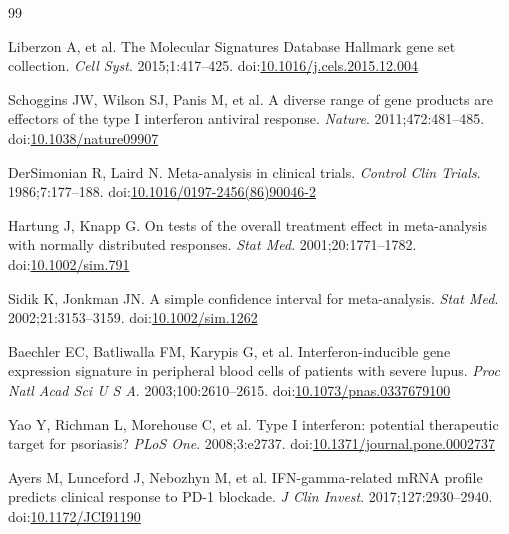 \documentclass[10pt]{article}
\begin{document}
{\footnotesize
\begin{thebibliography}{99}
\setlength{\itemsep}{0pt}\setlength{\parskip}{0pt}

Liberzon A, et al.
The Molecular Signatures Database Hallmark gene set collection.
\textit{Cell Syst}. 2015;1:417--425.
doi:\href{https://doi.org/10.1016/j.cels.2015.12.004}{10.1016/j.cels.2015.12.004}

Schoggins JW, Wilson SJ, Panis M, et al.
A diverse range of gene products are effectors of the type I interferon antiviral response.
\textit{Nature}. 2011;472:481--485.
doi:\href{https://doi.org/10.1038/nature09907}{10.1038/nature09907}

DerSimonian R, Laird N.
Meta-analysis in clinical trials.
\textit{Control Clin Trials}. 1986;7:177--188.
doi:\href{https://doi.org/10.1016/0197-2456(86)90046-2}{10.1016/0197-2456(86)90046-2}

Hartung J, Knapp G.
On tests of the overall treatment effect in meta-analysis with normally distributed responses.
\textit{Stat Med}. 2001;20:1771--1782.
doi:\href{https://doi.org/10.1002/sim.791}{10.1002/sim.791}

Sidik K, Jonkman JN.
A simple confidence interval for meta-analysis.
\textit{Stat Med}. 2002;21:3153--3159.
doi:\href{https://doi.org/10.1002/sim.1262}{10.1002/sim.1262}

Baechler EC, Batliwalla FM, Karypis G, et al.
Interferon-inducible gene expression signature in peripheral blood cells of patients with severe lupus.
\textit{Proc Natl Acad Sci U S A}. 2003;100:2610--2615.
doi:\href{https://doi.org/10.1073/pnas.0337679100}{10.1073/pnas.0337679100}

Yao Y, Richman L, Morehouse C, et al.
Type I interferon: potential therapeutic target for psoriasis?
\textit{PLoS One}. 2008;3:e2737.
doi:\href{https://doi.org/10.1371/journal.pone.0002737}{10.1371/journal.pone.0002737}

Ayers M, Lunceford J, Nebozhyn M, et al.
IFN-gamma-related mRNA profile predicts clinical response to PD-1 blockade.
\textit{J Clin Invest}. 2017;127:2930--2940.
doi:\href{https://doi.org/10.1172/JCI91190}{10.1172/JCI91190}

\end{thebibliography}
}
\end{document}
